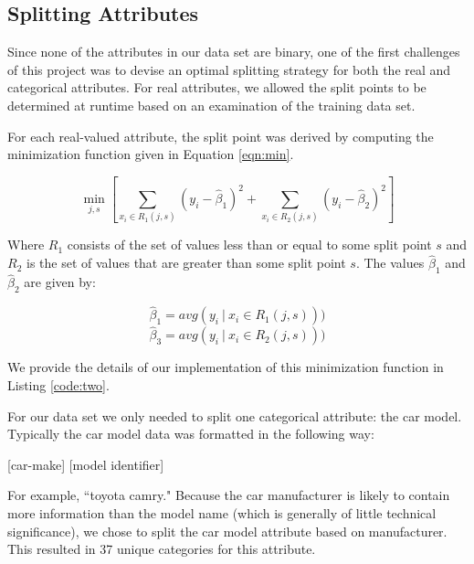 \documentclass[letterpaper,12pt]{article}
\begin{document}
 
\subsection{Splitting Attributes}

Since none of the attributes in our data set are binary, one of the first challenges of this project was to devise an optimal splitting strategy for both the real and categorical attributes. For real attributes, we allowed the split points to be determined at runtime based on an examination of the training data set.

For each real-valued attribute, the split point was derived by computing the minimization function given in Equation \ref{eqn:min}.

\begin{equation}
  \min_{j,s} \left[\sum_{x_i \in R_1(j,s)} (y_i - \hat\beta_1)^2 + \sum_{x_i \in R_2(j,s)} (y_i - \hat\beta_2)^2\right]
  \label{eqn:min}
\end{equation} 

Where $R_1$ consists of the set of values less than or equal to some split point $s$ and $R_2$ is the set of values that are greater than some split point $s$. The values $\hat\beta_1$ and $\hat\beta_2$ are given by:

\[
\hat\beta_1 = avg(y_i ~|~ x_i \in R_1(j,s)))
\]
\[
\hat\beta_3 = avg(y_i ~|~ x_i \in R_2(j,s)))
\]

We provide the details of our implementation of this minimization function in Listing \ref{code:two}.

For our data set we only needed to split one categorical attribute: the car model. Typically the car model data was formatted in the following way:

\begin{center}
  [car-make] [model identifier]
\end{center}

For example, ``toyota camry." Because the car manufacturer is likely to contain more information than the model name (which is generally of little technical significance), we chose to split the car model attribute based on manufacturer. This resulted in 37 unique categories for this attribute. 
\end{document}
